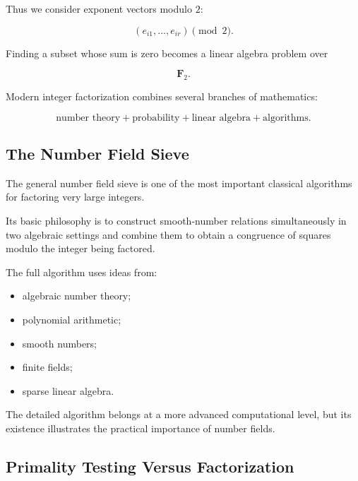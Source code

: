 Thus we consider exponent vectors modulo \(2\):

\[ (e_{i1},\ldots,e_{ir})\pmod2. \]

Finding a subset whose sum is zero becomes a linear algebra problem over

\[ \mathbf F_2. \]

\begin{conceptbox}
Modern integer factorization combines several branches of mathematics:

\[
\boxed{
\text{number theory}
+
\text{probability}
+
\text{linear algebra}
+
\text{algorithms}.
}
\]
\end{conceptbox}

\subsection{The Number Field Sieve}
\label{subsec:number-field-sieve}

The general number field sieve is one of the most important classical
algorithms for factoring very large integers.

Its basic philosophy is to construct smooth-number relations simultaneously
in two algebraic settings and combine them to obtain a congruence of squares
modulo the integer being factored.

The full algorithm uses ideas from:

\begin{itemize}
    \item algebraic number theory;
    \item polynomial arithmetic;
    \item smooth numbers;
    \item finite fields;
    \item sparse linear algebra.
\end{itemize}

The detailed algorithm belongs at a more advanced computational level, but
its existence illustrates the practical importance of number fields.

\subsection{Primality Testing Versus Factorization}
\label{subsec:primality-versus-factorization}

